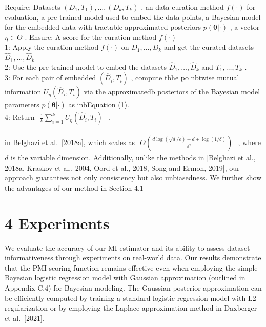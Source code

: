 Require: Datasets
\(( D _ { 1 } , T _ { 1 } ) , \dots , ( D _ { k } , T _ { k } )\) , an
data curation method \(f ( \cdot )\) for evaluation, a pre-trained model
used to embed the data points, a Bayesian model for the embedded data
with tractable approximated posteriors \(p ( \pmb \theta | \cdot )\) , a
vector \(\eta \in \Theta\) . Ensure: A score for the curation method
\(f ( \cdot )\)\\
1: Apply the curation method \(f ( \cdot )\) on
\(D _ { 1 } , \ldots , D _ { k }\) and get the curated datasets
\(\widehat { D } _ { 1 } , \ldots , \widehat { D } _ { k }\)\\
2: Use the pre-trained model to embed the datasets
\(\widehat { D } _ { 1 } , \ldots , \widehat { D } _ { k }\) and
\(T _ { 1 } , \dots , T _ { k }\) .\\
3: For each pair of embedded \(( \widehat { D } _ { i } , T _ { i } )\)
, compute tbhe po nbtwise mutual information
\(U _ { \eta } ( \widehat { D } _ { i } , T _ { i } )\) via the
approximatedb posteriors of the Bayesian model parameters
\(p ( \pmb \theta | \cdot )\) as inbEquation (1).\\
4: Return
\(\begin{array} { r } { \frac { 1 } { k } \sum _ { i = 1 } ^ { k } U _ { \eta } ( \widehat { D } _ { i } , T _ { i } ) } \end{array}\)
.

in Belghazi et al.~{[}2018a{]}, which scales as
\(\begin{array} { r } { O \left( \frac { d \log ( \sqrt { d } / \varepsilon ) + d + \log ( 1 / \delta ) } { \varepsilon ^ { 2 } } \right) } \end{array}\)
, where \(d\) is the variable dimension. Additionally, unlike the
methods in {[}Belghazi et al., 2018a, Kraskov et al., 2004, Oord et al.,
2018, Song and Ermon, 2019{]}, our approach guarantees not only
consistency but also unbiasedness. We further show the advantages of our
method in Section 4.1

\section{4 Experiments}\label{experiments}

We evaluate the accuracy of our MI estimator and its ability to assess
dataset informativeness through experiments on real-world data. Our
results demonstrate that the PMI scoring function remains effective even
when employing the simple Bayesian logistic regression model with
Gaussian approximation (outlined in Appendix C.4) for Bayesian modeling.
The Gaussian posterior approximation can be efficiently computed by
training a standard logistic regression model with L2 regularization or
by employing the Laplace approximation method in Daxberger et
al.~{[}2021{]}.

